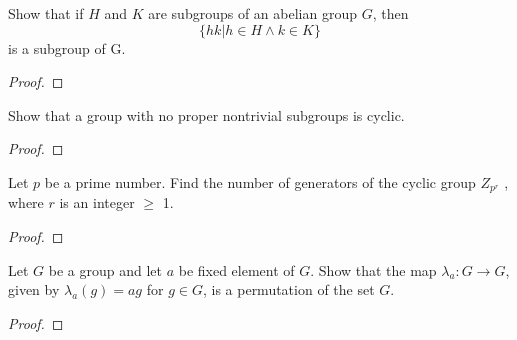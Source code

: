\begin{theorem}[Exercise 4]\label{Ex4}
  \leanok
    Show that if $H$ and $K$ are subgroups of an abelian group $G$, then
    $$
    \{hk|h \in H \land k \in K\}
    $$
    is a subgroup of G.
\end{theorem}
\begin{proof}
  \leanok
\end{proof}

\begin{theorem}[Exercise 5]\label{Ex5}
  \leanok
Show that a group with no proper nontrivial subgroups is cyclic.

\end{theorem}
\begin{proof}
  \leanok
\end{proof}

\begin{theorem}[Exercise 6]\label{Ex6}
  \leanok
    Let $p$ be a prime number. Find the number of generators of the cyclic group $Z_{p^r}$ , where $r$ is an integer $\ge$ 1.
\end{theorem}
\begin{proof}
  \leanok
\end{proof}

\begin{theorem}[Exercise 13]\label{Ex13}
  \leanok
    Let $G$ be a group and let $a$ be fixed element of $G$. Show that the map $\lambda_a: G\to G$, given by $\lambda_a(g)=ag$ for $g\in G$, is a permutation of the set $G$.
\end{theorem}
\begin{proof}
  \leanok
\end{proof}